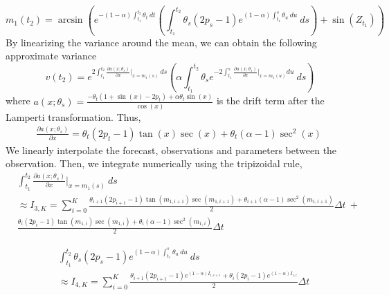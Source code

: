 \documentclass[a4paper, 12pt]{article}
\begin{document}
\begin{itemize}
\begin{itemize}
		\begin{equation*}
					m_1(t_2)= \arcsin \left( e^{- (1-\alpha) \int_{t_1}^{t_2} \theta_t \ dt }  \left(  \int_{t_1}^{t_2} \theta_s \left( 2p_s-1\right)e^{(1-\alpha) \int_{t_1}^{s} \theta_u \ du } \ ds \right) + \sin (Z_{t_1}) \right)
		\end{equation*}
		By linearizing the variance around the mean, we can obtain the following approximate variance
		\begin{equation}
					v(t_2)= e^{2\int_{t_1}^{t_2} \frac{\partial a(x;\theta_s)}{\partial x}|_{x=m_1(s)} \ ds} \left(\alpha \int_{t_1}^{t_2} \theta_s e^{-2\int_{t_1}^{s} \frac{\partial a(x;\theta_s)}{\partial x}|_{x=m_1(u)} du } \ ds  \right)
		\end{equation}
		where $a(x;\theta_s)=\frac{- \theta_t (1+ \sin(x) - 2p_t) + \alpha \theta_t \sin (x)   }{\cos (x)}$ is the drift term after the Lamperti transformation. Thus,
		\begin{align*}
			\frac{\partial a(x;\theta_s)}{\partial x} = \theta_t (2p_t - 1) \tan (x) \sec (x) + \theta_t (\alpha - 1)\sec^2 (x) \
		\end{align*}
		We linearly interpolate the forecast, observations and parameters between the observation. Then, we integrate numerically using the tripizoidal rule,
		\begin{equation*}
			\begin{split}
			& \int_{t_1}^{t_2}  \frac{\partial a(x;\theta_s)}{\partial x}|_{x=m_1(s)} \ ds \\
			& \approx I_{3,K}= \sum_{i=0}^K \frac{ \theta_{i+1} (2p_{i+1} - 1) \tan (m_{1,i+1}) \sec (m_{1,i+1}) + \theta_{i+1}(\alpha - 1)\sec^2 (m_{1,i+1}) }{2} \Delta t \ + \\
			& \frac{ \theta_i (2p_i - 1) \tan (m_{1,i}) \sec (m_{1,i}) + \theta_{i} (\alpha - 1)\sec^2 (m_{1,i}) }{2} \Delta t
			\end{split}
		\end{equation*}

		\begin{equation*}
			\begin{split}
			& \int_{t_1}^{t_2} \theta_s \left( 2p_s-1\right)e^{(1-\alpha) \int_{t_1}^{s} \theta_u \ du } \ ds \\
			& \approx I_{4,K}= \sum_{i=0}^K \frac{ \theta_{i+1} \left( 2p_{i+1}-1\right)e^{(1-\alpha)I_{1,i+1} } +  \theta_i \left( 2p_i-1\right)e^{(1-\alpha) I_{1,i} }}{2} \Delta t \\
			\end{split}
		\end{equation*}


\end{itemize}
\end{itemize}
\end{document}
